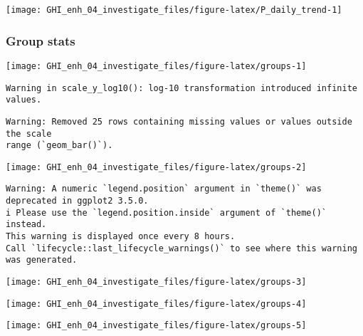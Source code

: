 \documentclass[
  10pt,
  a4paper,oneside]{article}
\begin{document}
\begin{center}\texttt{[image: GHI\_enh\_04\_investigate\_files/figure-latex/P\_daily\_trend-1]} \end{center}

\newpage
\FloatBarrier

\hypertarget{group-stats}{%
\subsubsection{Group stats}\label{group-stats}}

\begin{center}\texttt{[image: GHI\_enh\_04\_investigate\_files/figure-latex/groups-1]} \end{center}

\begin{verbatim}
Warning in scale_y_log10(): log-10 transformation introduced infinite values.
\end{verbatim}

\begin{verbatim}
Warning: Removed 25 rows containing missing values or values outside the scale
range (`geom_bar()`).
\end{verbatim}

\begin{center}\texttt{[image: GHI\_enh\_04\_investigate\_files/figure-latex/groups-2]} \end{center}

\begin{verbatim}
Warning: A numeric `legend.position` argument in `theme()` was deprecated in ggplot2 3.5.0.
i Please use the `legend.position.inside` argument of `theme()` instead.
This warning is displayed once every 8 hours.
Call `lifecycle::last_lifecycle_warnings()` to see where this warning was generated.
\end{verbatim}

\begin{center}\texttt{[image: GHI\_enh\_04\_investigate\_files/figure-latex/groups-3]} \end{center}

\begin{center}\texttt{[image: GHI\_enh\_04\_investigate\_files/figure-latex/groups-4]} \end{center}

\begin{center}\texttt{[image: GHI\_enh\_04\_investigate\_files/figure-latex/groups-5]} \end{center}
\end{document}
